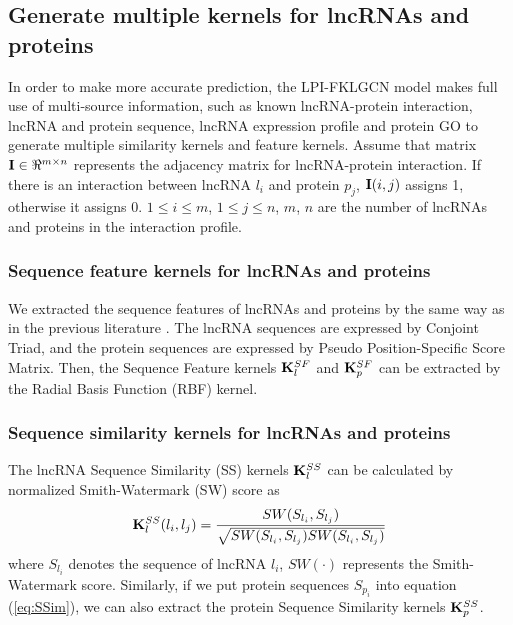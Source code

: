 \documentclass[fleqn,10pt]{wlscirep}
\begin{document}
\subsection*{Generate multiple kernels for lncRNAs and proteins}
In order to make more accurate prediction, the LPI-FKLGCN model makes full use of multi-source information, such as known lncRNA-protein interaction, lncRNA and protein sequence, lncRNA expression profile and protein GO to generate multiple similarity kernels and feature kernels. Assume that matrix ${\bf{I}} \in {\Re ^{m \times n}}$ represents the adjacency matrix for lncRNA-protein interaction. If there is an interaction between lncRNA ${{l_i}}$ and protein ${{p_j}}$, ${\bf{I}}(i,j)$ assigns 1, otherwise it assigns 0. $1 \le i \le m$, $1 \le j \le n$, $m$, $n$ are the number of lncRNAs and proteins in the interaction profile.

\subsubsection*{Sequence feature kernels for lncRNAs and proteins}
We extracted the sequence features of lncRNAs and proteins by the same way as in the previous literature \cite{Shen2019}. The lncRNA sequences are expressed by Conjoint Triad, and the protein sequences are expressed by Pseudo Position-Specific Score Matrix. Then, the Sequence Feature kernels ${\bf{K}}_l^{SF}$ and ${\bf{K}}_p^{SF}$ can be extracted by the Radial Basis Function (RBF) kernel.

\subsubsection*{Sequence similarity kernels for lncRNAs and proteins}
The lncRNA Sequence Similarity (SS) kernels ${\bf{K}}_l^{SS}$ can be calculated by normalized Smith-Watermark (SW) score as\cite{Shen2019}
\begin{equation}
{\bf{K}}_l^{SS}({l_i},{l_j}) = \frac{{SW({S_{{l_i}}},{S_{{l_j}}})}}{{\sqrt {SW({S_{{l_i}}},{S_{{l_j}}})SW({S_{{l_i}}},{S_{{l_j}}})} }} \label{eq:SSim}
\end{equation}
where ${{S_{{l_i}}}}$ denotes the sequence of lncRNA ${l_i}$, $SW( \cdot )$ represents the Smith-Watermark score. Similarly, if we put protein sequences ${{S_{{p_i}}}}$ into equation (\ref{eq:SSim}), we can also extract the protein Sequence Similarity kernels ${\bf{K}}_p^{SS}$.
\end{document}
